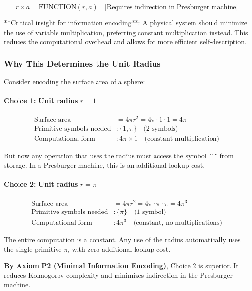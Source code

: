 \documentclass[11pt,a4paper]{article}
\begin{document}
  \[
  r \times a = \text{FUNCTION}(r, a) \quad \text{[Requires indirection in Presburger machine]}
  \]

  **Critical insight for information encoding**: A physical system should minimize the use of variable multiplication, preferring constant multiplication instead. This reduces the computational overhead and allows for more efficient self-description.

  \subsubsection{Why This Determines the Unit Radius}

  Consider encoding the surface area of a sphere:

  \paragraph{Choice 1: Unit radius $r = 1$}
  \begin{align*}
  \text{Surface area} &= 4\pi r^2 = 4\pi \cdot 1 \cdot 1 = 4\pi \\
  \text{Primitive symbols needed} &: \{1, \pi\} \quad \text{(2 symbols)} \\
  \text{Computational form} &: 4\pi \times 1 \quad \text{(constant multiplication)}
  \end{align*}

  But now any operation that uses the radius must access the symbol "1" from storage. In a Presburger machine, this is an additional lookup cost.

  \paragraph{Choice 2: Unit radius $r = \pi$}
  \begin{align*}
  \text{Surface area} &= 4\pi r^2 = 4\pi \cdot \pi \cdot \pi = 4\pi^3 \\
  \text{Primitive symbols needed} &: \{\pi\} \quad \text{(1 symbol)} \\
  \text{Computational form} &: 4\pi^3 \quad \text{(constant, no multiplications)}
  \end{align*}

  The entire computation is a constant. Any use of the radius automatically uses the single primitive $\pi$, with zero additional lookup cost.

  \noindent\textbf{By Axiom P2 (Minimal Information Encoding)}, Choice 2 is superior. It reduces Kolmogorov complexity and minimizes indirection in the Presburger machine.
\end{document}
